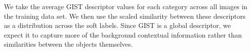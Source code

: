We take the average GIST descriptor \cite{oliva2001modeling} values for each
category across all images in the training data set. We then use the scaled
similarity between these descriptors as a distribution across the soft labels.
Since GIST is a global descriptor, we expect it to capture more of the
background contextual information rather than similarities between the objects
themselves.

%

